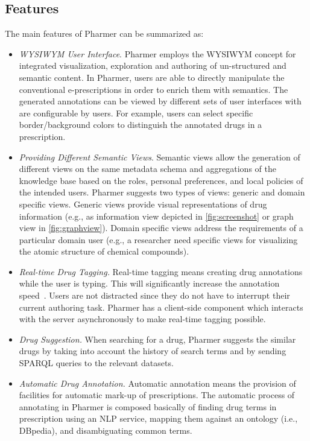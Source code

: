 \documentclass[journal]{IEEEtran}
\begin{document}
\subsection{Features}
The main features of Pharmer can be summarized as:
\begin{itemize}
    \item \emph{WYSIWYM User Interface}.
    Pharmer employs the WYSIWYM concept for integrated visualization, exploration and authoring of un-structured and semantic content.
    In Pharmer, users are able to directly manipulate the conventional e-prescriptions in order to enrich them with semantics.
    The generated annotations can be viewed by different sets of user interfaces with are configurable by users.
    For example, users can select specific border/background colors to distinguish the annotated drugs in a prescription.\\
	\item \emph{Providing Different Semantic Views}.
	Semantic views allow the generation of different views on the same metadata schema and aggregations of the knowledge base based on the roles, personal preferences, and local policies of the intended users.
	Pharmer suggests two types of views: generic and domain specific views.
	Generic views provide visual representations of drug information (e.g., as information view depicted in \autoref{fig:screenshot} or graph view in \autoref{fig:graphview}).
	Domain specific views address the requirements of a particular domain user (e.g., a researcher need specific views for visualizing the atomic structure of chemical compounds).\\
	\item \emph{Real-time Drug Tagging.}
	Real-time tagging means creating drug annotations while the user is typing.
	This will significantly increase the annotation speed~\cite{OCA}.
	Users are not distracted since they do not have to interrupt their current authoring task.
	Pharmer has a client-side component which interacts with the server asynchronously to make real-time tagging possible.\\
	\item \emph{Drug Suggestion.}
		When searching for a drug, Pharmer suggests the similar drugs by taking into account the history of search terms and by sending SPARQL queries to the relevant datasets.\\
    \item \emph{Automatic Drug Annotation.}
    Automatic annotation means the provision of facilities for automatic mark-up of prescriptions.
    The automatic process of annotating in Pharmer is composed basically of finding drug terms in prescription using an NLP service, mapping them against an ontology (i.e., DBpedia), and disambiguating common terms.
\end{itemize}
\end{document}
